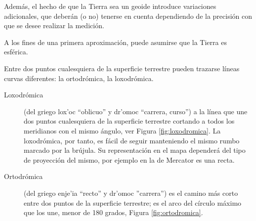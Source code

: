 Adem\'as, el hecho de que la Tierra sea un geoide introduce variaciones
adicionales, que deber\'an  (o no) tenerse en cuenta dependiendo de la precisi\'on con que se desee realizar la medici\'on. 

A los fines de una primera aproximaci\'on, puede asumirse que la Tierra es esf\'erica.

Entre dos puntos cualesquiera de la superficie terrestre pueden trazarse líneas curvas diferentes: la ortodrómica, la loxodrómica. %

\begin{description}
\item[Loxodr\'omica \label{loxodromica}]  (del griego   \greektext lox'oc
  \latintext ``oblicuo'' y \greektext dr'omoc
  \latintext  ``carrera, curso'') a la línea que une dos puntos cualesquiera de la
  superficie terrestre cortando a todos los meridianos con el mismo
  ángulo, ver Figura \ref{fig:loxodromica}. La loxodrómica, por tanto, es fácil de seguir manteniendo el
  mismo rumbo marcado por la brújula. Su representación en el mapa
  dependerá del tipo de proyección del mismo, por ejemplo en la de
  Mercator es una recta.

\item[Ortodrómica \label{ortodromica}] (del griego \greektext enje'ia 
\latintext ``recto'' y
\greektext dr'omoc
 \latintext ''carrera'') es el camino más corto entre dos puntos de la superficie terrestre; es el arco del círculo máximo que los une, menor de 180 grados, Figura \ref{fig:ortodromica}. 


\end{description}

